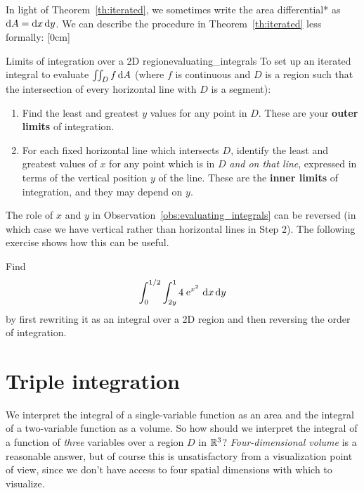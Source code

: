 \documentclass{watsonbook}
\begin{document}
In light of Theorem~\ref{th:iterated}, we sometimes write the area
differential* as $\mathrm{d} A = \mathrm{d} x \, \mathrm{d} y$. We can describe the procedure
in Theorem~\ref{th:iterated} less formally: [0cm]
\begin{obs}{Limits of integration over a 2D
    region}{evaluating_integrals}
      To set up an iterated integral to evaluate $\iint_D f \, {\mathrm{d}}A$ (where $f$ is continuous and $D$ is a
    region such that the intersection of every horizontal line with
    $D$ is a segment): 
  \begin{enumerate}[leftmargin=12pt, itemsep = 6pt, topsep = 5pt]
\item Find the least and greatest $y$ values for any point in
  $D$. These are your \textbf{outer limits} of integration. 
\item For each fixed horizontal line which intersects $D$, identify
  the least and greatest values of $x$ for any point which is in $D$
  \textit{and on that line}, expressed in terms of the vertical
  position $y$ of the line. These are the \textbf{inner limits} of
  integration, and they may depend on $y$.
\end{enumerate}
\end{obs}

The role of $x$ and $y$ in Observation~\ref{obs:evaluating_integrals} can
be reversed (in which case we have vertical rather than horizontal
lines in Step 2). The following exercise shows how this can be useful. 

\begin{exercise}{}{}
  Find
  \[
    \int_0^{1/2} \int_{2y}^1 4 \hspace{1pt} \operatorname{e}^{x^2}\, \mathrm{d} x\, \mathrm{d} y
  \]
  by first rewriting it as an integral over a 2D
  region and then reversing the order of integration.
\end{exercise}


\section{Triple integration} \label{sec:triple} 


We interpret the integral of a single-variable function as an area and
the integral of a two-variable function as a volume. So how should we
interpret the integral of a function of \textit{three} variables over
a region $D$ in $\mathbb{R}^3$?  \textit{Four-dimensional volume} is a reasonable
answer, but of course this is unsatisfactory from a visualization
point of view, since we don't have access to four spatial dimensions
with which to visualize.
\end{document}
